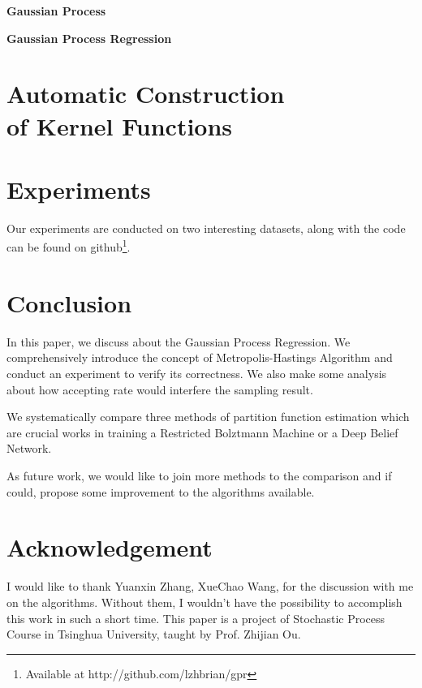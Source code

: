 \documentclass{sig-alternate-05-2015}
\newcommand{\para}[1]{{\vspace{2pt} \bf \noindent #1 \hspace{8pt}}}
\begin{document}
\para{Gaussian Process}

\para{Gaussian Process Regression}




\section{Automatic Construction\\ of Kernel Functions} \label{sec:autokernel}




\section{Experiments} \label{sec:experiment}

Our experiments are conducted on two interesting datasets, along with the code can be found on github\footnote{Available at http://github.com/lzhbrian/gpr}.


\section{} \label{sec:}

\section{} \label{sec:}



\section{Conclusion} \label{sec:conclusion}
In this paper, we discuss about the Gaussian Process Regression.
We comprehensively introduce the concept of Metropolis-Hastings Algorithm and conduct an experiment to verify its correctness. We also make some analysis about how accepting rate would interfere the sampling result.

We systematically compare three methods of partition function estimation which are crucial works in training a Restricted Bolztmann Machine or a Deep Belief Network. 

As future work, we would like to join more methods to the comparison and if could, propose some improvement to the algorithms available.




\renewcommand{\baselinestretch}{1.1}
\balance
\small
\section{Acknowledgement} \label{sec:acknowledgement}
I would like to thank Yuanxin Zhang, XueChao Wang, for the discussion with me on the algorithms. Without them, I wouldn't have the possibility to accomplish this work in such a short time. This paper is a project of Stochastic Process Course in Tsinghua University, taught by Prof. Zhijian Ou.




	
\end{document}

